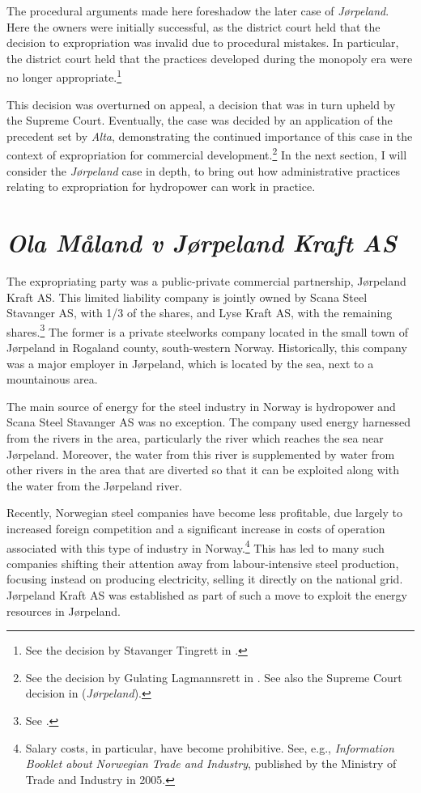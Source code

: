 The procedural arguments made here foreshadow the later case of {\it Jørpeland}. Here the owners were initially successful, as the district court held that the decision to expropriation was invalid due to procedural mistakes. In particular, the district court held that the practices  developed during the monopoly era were no longer appropriate.\footnote{See the decision by Stavanger Tingrett in \cite{jorpeland09}.} 

This decision was overturned on appeal, a decision that was in turn upheld by the Supreme Court. Eventually, the case was decided by an application of the precedent set by {\it Alta}, demonstrating the continued importance of this case in the context of expropriation for commercial development.\footnote{See the decision by Gulating Lagmannsrett in \cite{jorpeland11a}. See also the Supreme Court decision in \cite{jorpeland11} ({\it Jørpeland}).} In the next section, I will consider the {\it Jørpeland} case in depth, to bring out how administrative practices relating to expropriation for hydropower can work in practice.

\section{{\it Ola Måland v Jørpeland Kraft AS}}\label{sec:jorpeland}

The expropriating party was a public-private commercial partnership, Jørpeland Kraft AS. This limited liability company is jointly owned by Scana Steel Stavanger AS, with 1/3 of the shares, and Lyse Kraft AS, with the remaining shares.\footnote{See \cite[2]{jorpeland09}.} The former is a private steelworks company located in the small town of Jørpeland in Rogaland county, south-western Norway. Historically, this company was a major employer in Jørpeland, which is located by the sea, next to a mountainous area.

The main source of energy for the steel industry in Norway is hydropower and Scana Steel Stavanger AS was no exception. The company used energy harnessed from the rivers in the area, particularly the river which reaches the sea near Jørpeland. Moreover, the water from this river is supplemented by water from other rivers in the area that are diverted so that it can be exploited along with the water from the Jørpeland river.

Recently, Norwegian steel companies have become less profitable, due largely to increased foreign competition and a significant increase in costs of operation associated with this type of industry in Norway.\footnote{Salary costs, in particular, have become prohibitive. See, e.g., \emph{Information Booklet about Norwegian Trade and Industry}, published by the Ministry of Trade and Industry in 2005.} This has led to many such companies shifting their attention away from labour-intensive steel production, focusing instead on producing electricity, selling it directly on the national grid. Jørpeland Kraft AS was established as part of such a move to exploit the energy resources in Jørpeland.

